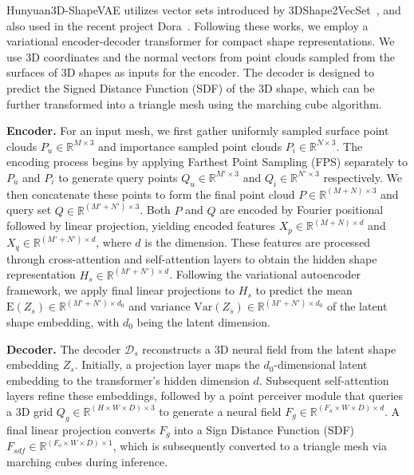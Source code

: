 Hunyuan3D-ShapeVAE utilizes vector sets introduced by 3DShape2VecSet~\cite{zhang20233dshape2vecset}, and also used in the recent project Dora~\cite{zhang2024clay,chen2024dora}. Following these works, we employ a variational encoder-decoder transformer for compact shape representations. We use 3D coordinates and the normal vectors from point clouds sampled from the surfaces of 3D shapes as inputs for the encoder. The decoder is designed to predict the Signed Distance Function (SDF) of the 3D shape, which can be further transformed into a triangle mesh using the marching cube algorithm.






\textbf{Encoder.} For an input mesh, we first gather uniformly sampled surface point clouds $P_u \in \mathbb{R}^{M \times 3}$ and importance sampled point clouds $P_i \in \mathbb{R}^{N \times 3}$. The encoding process begins by applying Farthest Point Sampling (FPS) separately to $P_u$ and $P_i$ to generate query points $Q_u \in \mathbb{R}^{M' \times 3}$ and $Q_i \in \mathbb{R}^{N' \times 3}$ respectively. We then concatenate these points to form the final point cloud $P \in \mathbb{R}^{(M+N) \times 3}$ and query set $Q \in \mathbb{R}^{(M'+N') \times 3}$. Both $P$ and $Q$ are encoded by Fourier positional followed by linear projection, yielding encoded features $X_p \in \mathbb{R}^{(M+N) \times d}$ and $X_q \in \mathbb{R}^{(M'+N') \times d}$, where $d$ is the dimension. These features are processed through cross-attention and self-attention layers to obtain the hidden shape representation $H_s \in \mathbb{R}^{(M'+N') \times d}$. Following the variational autoencoder framework, we apply final linear projections to $H_s$ to predict the mean $\mathrm{E}(Z_s) \in \mathbb{R}^{(M'+N') \times d_0}$ and variance $\mathrm{Var}(Z_s) \in \mathbb{R}^{(M'+N') \times d_0}$ of the latent shape embedding, with $d_0$ being the latent dimension.

\textbf{Decoder.} The decoder $\mathcal{D}_s$ reconstructs a 3D neural field from the latent shape embedding $Z_s$. Initially, a projection layer maps the $d_0$-dimensional latent embedding to the transformer's hidden dimension $d$. Subsequent self-attention layers refine these embeddings, followed by a point perceiver module that queries a 3D grid $Q_g \in \mathbb{R}^{ (H \times W \times D) \times 3}$ to generate a neural field $F_g \in \mathbb{R}^{ (F_n \times W \times D) \times d}$. A final linear projection converts $F_g$ into a Sign Distance Function (SDF) $F_{sdf} \in \mathbb{R}^{ (F_o \times W \times D) \times 1}$, which is subsequently converted to a triangle mesh via marching cubes during inference.

